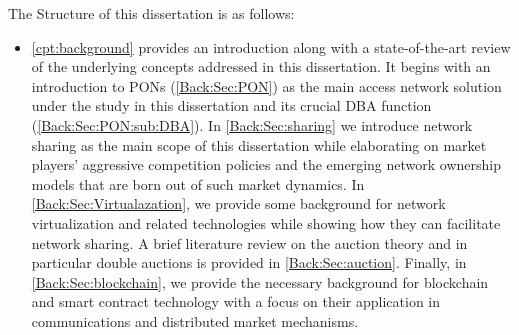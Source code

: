 The Structure of this dissertation is as follows:
    \begin{itemize}
    \item \autoref{cpt:background} provides an introduction along with a state-of-the-art review of the underlying concepts addressed in this dissertation. It begins with an introduction to \acp{PON} (\autoref{Back:Sec:PON}) as the main access network solution under the study in this dissertation and its crucial \ac{DBA} function (\autoref{Back:Sec:PON:sub:DBA}). In \autoref{Back:Sec:sharing} we introduce network sharing as the main scope of this dissertation while elaborating on market players' aggressive competition policies and the emerging network ownership models that are born out of such market dynamics. 
    In \autoref{Back:Sec:Virtualazation}, we provide some background for network virtualization and related technologies while showing how they can facilitate network sharing. A brief literature review on the auction theory and in particular double auctions is provided in \autoref{Back:Sec:auction}. Finally, in \autoref{Back:Sec:blockchain}, we provide the necessary background for blockchain and smart contract technology with a focus on their application in communications and distributed market mechanisms. 
    
    

\end{itemize}
